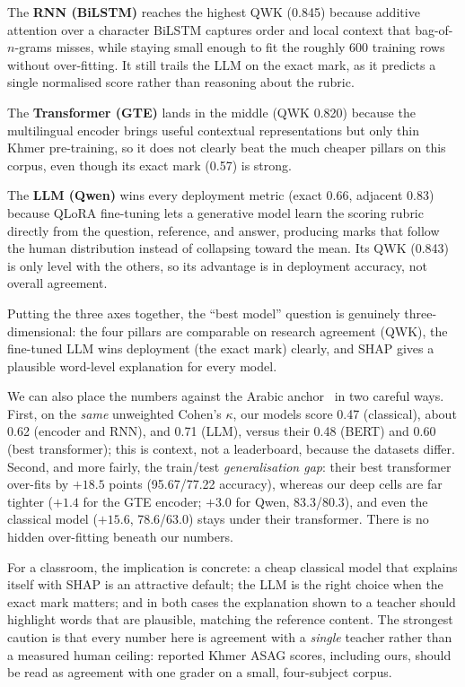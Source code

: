 The \textbf{RNN (BiLSTM)} reaches the highest QWK (0.845) because additive attention over a character
BiLSTM captures order and local context that bag-of-$n$-grams misses, while staying small enough to fit
the roughly 600 training rows without over-fitting. It still trails the LLM on the exact mark, as it
predicts a single normalised score rather than reasoning about the rubric.

The \textbf{Transformer (GTE)} lands in the middle (QWK 0.820) because the multilingual encoder brings
useful contextual representations but only thin Khmer pre-training, so it does not clearly beat the much
cheaper pillars on this corpus, even though its exact mark (0.57) is strong.

The \textbf{LLM (Qwen)} wins every deployment metric (exact 0.66, adjacent 0.83) because QLoRA
fine-tuning lets a generative model learn the scoring rubric directly from the question, reference, and
answer, producing marks that follow the human distribution instead of collapsing toward the mean. Its
QWK (0.843) is only level with the others, so its advantage is in deployment accuracy, not overall
agreement.

Putting the three axes together, the ``best model'' question is genuinely three-dimensional: the four
pillars are comparable on research agreement (QWK), the fine-tuned LLM wins deployment (the exact mark)
clearly, and SHAP gives a plausible word-level explanation for every model.

We can also place the numbers against the Arabic anchor~\citep{alaoui2024} in two careful ways. First,
on the \emph{same} unweighted Cohen's $\kappa$, our models score 0.47 (classical), about 0.62 (encoder
and RNN), and 0.71 (LLM), versus their 0.48 (BERT) and 0.60 (best transformer); this is context, not a
leaderboard, because the datasets differ. Second, and more fairly, the train/test \emph{generalisation
gap}: their best transformer over-fits by $+18.5$ points (95.67/77.22 accuracy), whereas our deep cells
are far tighter ($+1.4$ for the GTE encoder; $+3.0$ for Qwen, 83.3/80.3), and even the classical model
($+15.6$, 78.6/63.0) stays under their transformer. There is no hidden over-fitting beneath our
numbers.

For a classroom, the implication is concrete: a cheap classical model that explains itself with SHAP
is an attractive default; the LLM is the right choice when the exact mark matters; and in both cases
the explanation shown to a teacher should highlight words that are plausible, matching the reference content. The
strongest caution is that every number here is agreement with a \emph{single} teacher rather than a
measured human ceiling: reported Khmer ASAG scores, including ours, should be read as agreement with one
grader on a small, four-subject corpus.
